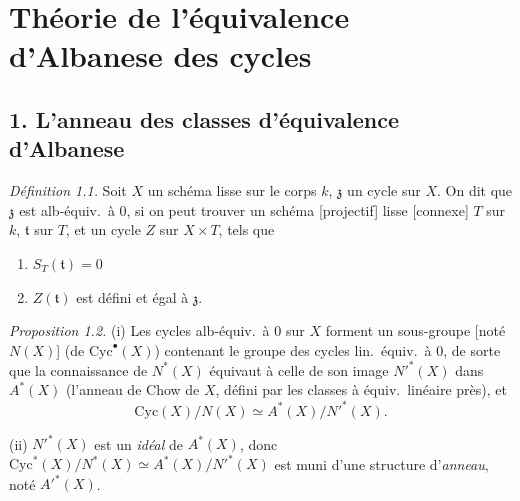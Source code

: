 \documentclass[11pt,a4paper]{article}
\begin{document}
\section{Théorie de l'équivalence d'Albanese des cycles}



\subsection*{1. L'anneau des classes d'équivalence d'Albanese}


\emph{Définition 1.1.} Soit $X$ un schéma  lisse sur le
corps $k$, $\mathfrak{z}$ un cycle sur $X$. On dit que $\mathfrak{z}$ est
alb-équiv.\ à $0$, si on peut trouver un schéma [projectif] lisse
\struck{\ill{}} [connexe] $T$ sur $k$, 
$\mathfrak{t}$ sur $T$, et un cycle $Z$ sur $X \times T$, tels que
\begin{enumerate}
  \item[(i)] [$\mathfrak{t}$ est de degré $0$ et] $S_{T}(\mathfrak{t}) = 0$
  \item[(ii)] $Z(\mathfrak{t})$ est défini et égal à $\mathfrak{z}$.
\end{enumerate}

\emph{Proposition 1.2.} (i) Les cycles alb-équiv.\ à $0$ sur $X$ forment un
sous-groupe [noté $N(X)$] (de $\mathrm{Cyc}^{\bullet}(X)$) contenant le
groupe des cycles lin.\ équiv.\ à $0$, de sorte que la connaissance de
$N^{*}(X)$ équivaut à celle de son image $N'^{*}(X)$ dans
 $A^{*}(X)$ (l'anneau de Chow de $X$, défini par les
classes à équiv.\ linéaire près), et
\[
  \mathrm{Cyc}(X)/N(X) \simeq A^{*}(X)/N'^{*}(X).
\]

(ii) $N'^{*}(X)$ est un \emph{idéal} de $A^{*}(X)$, donc
$\mathrm{Cyc}^{*}(X)/N^{*}(X) \simeq A^{*}(X)/N'^{*}(X)$ est muni d'une
structure d'\emph{anneau}, noté $A'^{*}(X)$.
\end{document}
